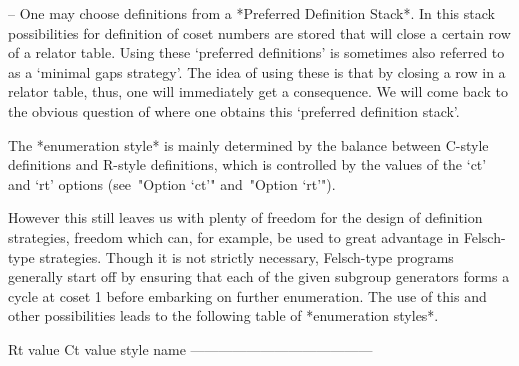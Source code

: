 \item{--} One may choose  definitions  from  a  *Preferred  Definition
Stack*. In this stack possibilities for definition  of  coset  numbers
are stored that will close a certain row of  a  relator  table.  Using
these \lq{}preferred definitions' is sometimes also referred to  as  a
\lq{}minimal gaps strategy'. The  idea  of  using  these  is  that  by
closing a row in a relator table, thus, one  will  immediately  get  a
consequence. We will come back to the obvious question  of  where  one
obtains this \lq{}preferred definition stack'.

\endlist

The *enumeration style* is mainly determined by  the  balance  between
C-style definitions and R-style definitions, which  is  controlled  by
the values of the `ct' and `rt' options (see~"Option `ct'" and~"Option
`rt'").

However this still leaves us with  plenty of freedom for the design of
definition  strategies,  freedom which  can, for example,  be  used to
great advantage in Felsch-type strategies. Though it is  not  strictly
necessary, Felsch-type  programs generally start off  by ensuring that
each of the given subgroup generators  forms a cycle at coset 1 before
embarking  on   further  enumeration.  The  use  of   this  and  other
possibilities leads to the following table of *enumeration styles*.


\begintt
Rt value     Ct value     style name
---------------------------------------

